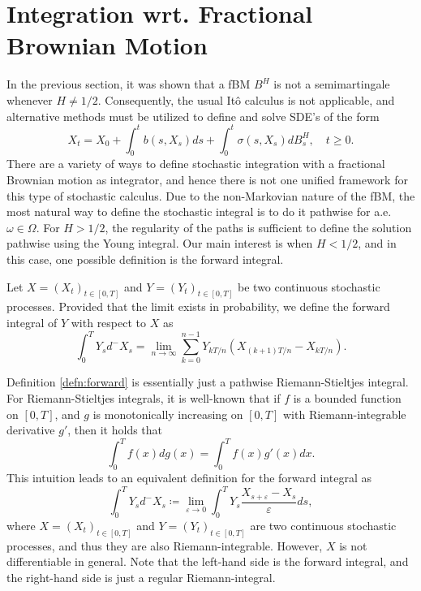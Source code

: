 \section{Integration wrt. Fractional Brownian Motion}
In the previous section, it was shown that a fBM $B^H$ is not a semimartingale whenever $H\neq 1/2$. Consequently, the usual Itô calculus is not applicable, and alternative methods must be utilized to define and solve SDE's of the form
\begin{equation}
    X_{t}=X_{0}+\int_{0}^{t}b(s,X_{s})ds + \int_{0}^{t}\sigma(s,X_{s})dB_{s}^{H},\quad t\geq 0. 
\end{equation}
There are a variety of ways to define stochastic integration with a fractional Brownian motion as integrator, and hence there is not one unified framework for this type of stochastic calculus. Due to the non-Markovian nature of the fBM, the most natural way to define the stochastic integral is to do it pathwise for a.e. $\omega\in \Omega$. For $H>1/2$, the regularity of the paths is sufficient to define the solution pathwise using the Young integral. Our main interest is when $H<1/2$, and in this case, one possible definition is the forward integral.
\begin{defn}\label{defn:forward}
    Let $X=(X_{t})_{t\in [0,T]}$ and $Y=(Y_{t})_{t\in [0,T]}$ be two continuous stochastic processes. Provided that the limit exists in probability, we define the forward integral of $Y$ with respect to $X$ as
    \begin{equation}
        \int_{0}^{T}Y_{s}d^{-}X_{s}=\lim_{n\to\infty}\sum_{k=0}^{n-1}Y_{kT/n}(X_{(k+1)T/n}-X_{kT/n}).
    \end{equation}
\end{defn}
Definition \ref{defn:forward} is essentially just a pathwise Riemann-Stieltjes integral. For Riemann-Stieltjes integrals, it is well-known that if $f$ is a bounded function on $[0,T]$, and $g$ is monotonically increasing on $[0,T]$ with Riemann-integrable derivative $g'$, then it holds that
\begin{equation}
    \int_{0}^{T}f(x)dg(x)=\int_{0}^{T}f(x)g'(x)dx.
\end{equation}
This intuition leads to an equivalent definition for the forward integral as
\begin{equation}\label{defn:forward2}
    \int_{0}^{T}Y_{s}d^{-}X_{s}\coloneqq \lim_{\varepsilon\to 0}\int_{0}^{T}Y_{s}\frac{X_{s+\varepsilon}-X_{s}}{\varepsilon}ds,
\end{equation}
where $X=(X_{t})_{t\in [0,T]}$ and $Y=(Y_{t})_{t\in [0,T]}$ are two continuous stochastic processes, and thus they are also Riemann-integrable. However, $X$ is not differentiable in general. Note that the left-hand side is the forward integral, and the right-hand side is just a regular Riemann-integral.  

